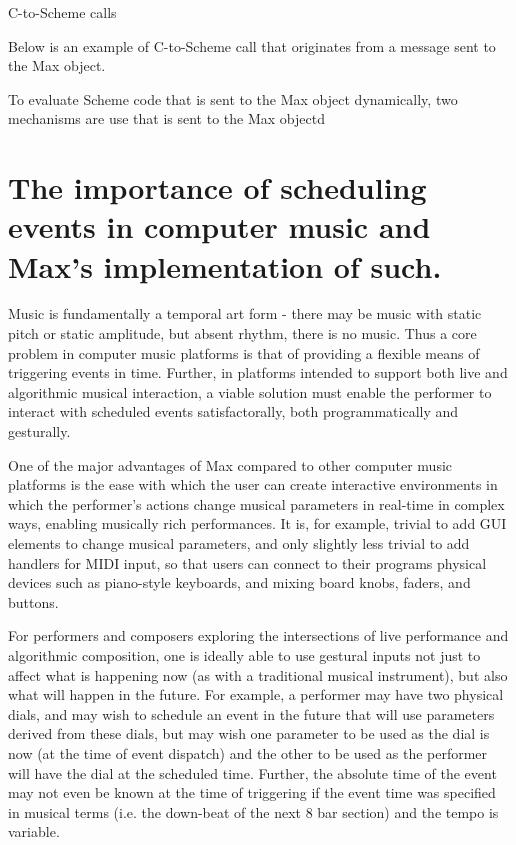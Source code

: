 \documentclass[acmsmall]{acmart}
\begin{document}

C-to-Scheme calls 

Below is an example of C-to-Scheme call that originates from a message sent
to the Max object.

To evaluate Scheme code that is sent to the Max object dynamically, two mechanisms are use that is sent to the Max objectd
  
 

\section{The importance of scheduling events in computer music and Max's implementation of such.}

Music is fundamentally a temporal art form - there may be music with static pitch
or static amplitude, but absent rhythm, there is no music.  
Thus a core problem in computer music platforms is that of providing a flexible 
means of triggering events in time. Further, in platforms intended to support both
live and algorithmic musical interaction, a viable solution must enable the performer
to interact with scheduled events satisfactorally, both programmatically and gesturally. 

One of the major advantages of Max compared to other computer music platforms 
is the ease with which the user can create interactive environments in which the performer's actions 
change musical parameters in real-time in complex ways, enabling 
musically rich performances. It is, for example, trivial to add GUI elements to change
musical parameters, and only slightly less trivial to add handlers for MIDI input, 
so that users can connect to their programs physical devices such as
piano-style keyboards, and mixing board knobs, faders, and buttons. 

For performers and composers exploring the intersections of live performance and algorithmic
composition, one is ideally able to use gestural inputs not just to affect
what is happening now (as with a traditional musical instrument), but also what will 
happen in the future. For example, a performer may have two physical dials,
and may wish to schedule an event in the future that will use parameters derived
from these dials, but may wish one parameter to be used as the dial is now
(at the time of event dispatch) 
and the other to be used as the performer will have the dial at the scheduled time.
Further, the absolute time of the event may not even be known at the time of 
triggering if the event time was specified in musical terms 
(i.e. the down-beat of the next 8 bar section) and the tempo is variable. 
\end{document}

